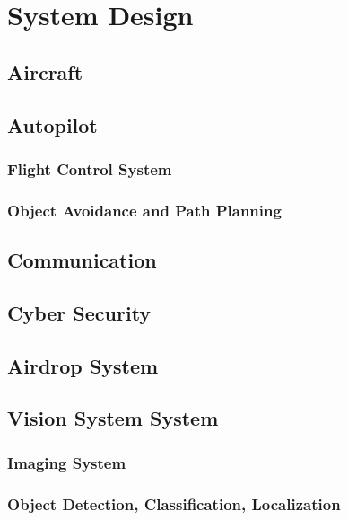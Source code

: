 
\section{System Design}
\label{sec2:design_analysis}


\subsection{Aircraft}


\subsection{Autopilot}
\subsubsection{Flight Control System}

\subsubsection{Object Avoidance and Path Planning}


\subsection{Communication}


\subsection{Cyber Security}


\subsection{Airdrop System}

\subsection{Vision System System}
\subsubsection{Imaging System}

\subsubsection{Object Detection, Classification, Localization}




\endinput

